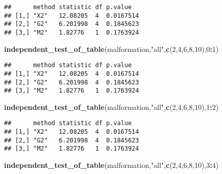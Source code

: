 \documentclass[12pt,hyperref,]{ctexart}
\newenvironment{Shaded}{\begin{snugshade}}{\end{snugshade}}
\newcommand{\DecValTok}[1]{\textcolor[rgb]{0.00,0.00,0.81}{#1}}
\newcommand{\KeywordTok}[1]{\textcolor[rgb]{0.13,0.29,0.53}{\textbf{#1}}}
\newcommand{\NormalTok}[1]{#1}
\newcommand{\OperatorTok}[1]{\textcolor[rgb]{0.81,0.36,0.00}{\textbf{#1}}}
\newcommand{\StringTok}[1]{\textcolor[rgb]{0.31,0.60,0.02}{#1}}
\begin{document}
\begin{verbatim}
##      method statistic df p.value  
## [1,] "X2"   12.08205  4  0.0167514
## [2,] "G2"   6.201998  4  0.1845623
## [3,] "M2"   1.82776   1  0.1763924
\end{verbatim}

\begin{Shaded}
\begin{Highlighting}[]
\KeywordTok{independent_test_of_table}\NormalTok{(malformation,}\StringTok{"all"}\NormalTok{,}\KeywordTok{c}\NormalTok{(}\DecValTok{2}\NormalTok{,}\DecValTok{4}\NormalTok{,}\DecValTok{6}\NormalTok{,}\DecValTok{8}\NormalTok{,}\DecValTok{10}\NormalTok{),}\DecValTok{0}\OperatorTok{:}\DecValTok{1}\NormalTok{)}
\end{Highlighting}
\end{Shaded}

\begin{verbatim}
##      method statistic df p.value  
## [1,] "X2"   12.08205  4  0.0167514
## [2,] "G2"   6.201998  4  0.1845623
## [3,] "M2"   1.82776   1  0.1763924
\end{verbatim}

\begin{Shaded}
\begin{Highlighting}[]
\KeywordTok{independent_test_of_table}\NormalTok{(malformation,}\StringTok{"all"}\NormalTok{,}\KeywordTok{c}\NormalTok{(}\DecValTok{2}\NormalTok{,}\DecValTok{4}\NormalTok{,}\DecValTok{6}\NormalTok{,}\DecValTok{8}\NormalTok{,}\DecValTok{10}\NormalTok{),}\DecValTok{1}\OperatorTok{:}\DecValTok{2}\NormalTok{)}
\end{Highlighting}
\end{Shaded}

\begin{verbatim}
##      method statistic df p.value  
## [1,] "X2"   12.08205  4  0.0167514
## [2,] "G2"   6.201998  4  0.1845623
## [3,] "M2"   1.82776   1  0.1763924
\end{verbatim}

\begin{Shaded}
\begin{Highlighting}[]
\KeywordTok{independent_test_of_table}\NormalTok{(malformation,}\StringTok{"all"}\NormalTok{,}\KeywordTok{c}\NormalTok{(}\DecValTok{2}\NormalTok{,}\DecValTok{4}\NormalTok{,}\DecValTok{6}\NormalTok{,}\DecValTok{8}\NormalTok{,}\DecValTok{10}\NormalTok{),}\DecValTok{3}\OperatorTok{:}\DecValTok{4}\NormalTok{)}
\end{Highlighting}
\end{Shaded}
\end{document}
